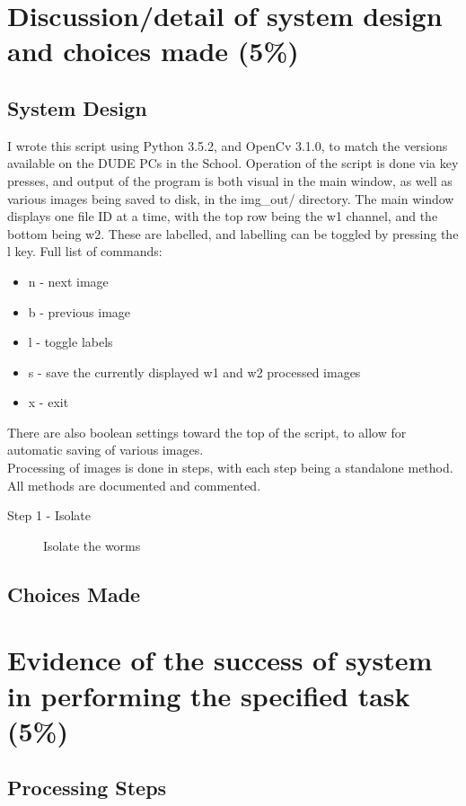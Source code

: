 \documentclass[a4paper,12pt]{article}
\begin{document}
\section*{Discussion/detail of system design and choices made (5\%)}
\subsection*{System Design}
I wrote this script using Python 3.5.2, and OpenCv 3.1.0, to match the versions available on the DUDE PCs in the School.
Operation of the script is done via key presses, and output of the program is both visual in the main window, as well as various images being saved to disk, in the img\_out/ directory.
The main window displays one file ID at a time, with the top row being the w1 channel, and the bottom being w2. These are labelled, and labelling can be toggled by pressing the l key.
Full list of commands:
\begin{itemize}
    \item n - next image
    \item b - previous image
    \item l - toggle labels
    \item s - save the currently displayed w1 and w2 processed images
    \item x - exit
\end{itemize}
There are also boolean settings toward the top of the script, to allow for automatic saving of various images. \\
Processing of images is done in steps, with each step being a standalone method. All methods are documented and commented.
\begin{description}
    \item[Step 1 - Isolate] Isolate the worms
\end{description}

\subsection*{Choices Made}

\section*{Evidence of the success of system in performing the specified task (5\%)}
\subsection*{Processing Steps}

\end{document}
